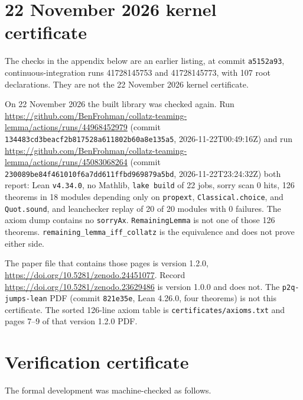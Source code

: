 \documentclass[11pt]{article}
\begin{document}
\section{22 November 2026 kernel certificate}
The checks in the appendix below are an earlier listing, at commit \texttt{a5152a93}, continuous-integration runs 41728145753 and 41728145773, with 107 root declarations. They are not the 22 November 2026 kernel certificate.

On 22 November 2026 the built library was checked again. Run \url{https://github.com/BenFrohman/collatz-teaming-lemma/actions/runs/44968452979} (commit \texttt{134483cd3beacf2b817528a611802b60a8e135a5}, 2026-11-22T00:49:16Z) and run \url{https://github.com/BenFrohman/collatz-teaming-lemma/actions/runs/45083068264} (commit \texttt{230089be84f461010f6a7dd611ffbd969879a5bd}, 2026-11-22T23:24:32Z) both report: Lean \texttt{v4.34.0}, no Mathlib, \texttt{lake build} of 22 jobs, sorry scan 0 hits, 126 theorems in 18 modules depending only on \texttt{propext}, \texttt{Classical.choice}, and \texttt{Quot.sound}, and leanchecker replay of 20 of 20 modules with 0 failures. The axiom dump contains no \texttt{sorryAx}. \texttt{RemainingLemma} is not one of those 126 theorems. \texttt{remaining\_lemma\_iff\_collatz} is the equivalence and does not prove either side.

The paper file that contains those pages is version 1.2.0, \url{https://doi.org/10.5281/zenodo.24451077}. Record \url{https://doi.org/10.5281/zenodo.23629486} is version 1.0.0 and does not. The \texttt{p2q-jumps-lean} PDF (commit \texttt{821e35e}, Lean 4.26.0, four theorems) is not this certificate. The sorted 126-line axiom table is \texttt{certificates/axioms.txt} and pages 7--9 of that version 1.2.0 PDF.

\appendix
\section{Verification certificate}\label{app:verification-certificate}

The formal development was machine-checked as follows.
\end{document}
